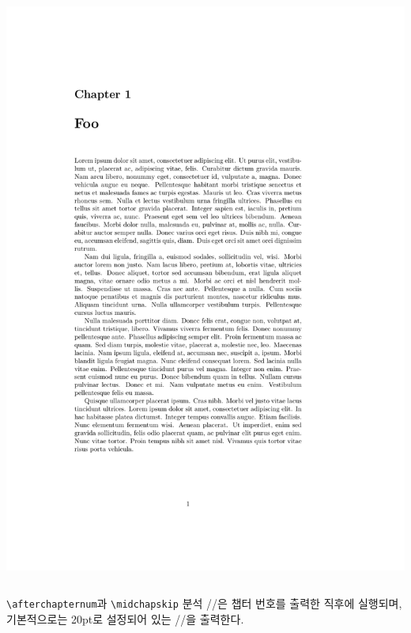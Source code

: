 \documentclass{beamer}
\def\tbs{\textbackslash}
\begin{document}
\begin{frame}[fragile]
\begin{overprint}
\begin{columns}
      \begin{column}{0.5\textwidth}
        \begin{latexcode}
          \renewcommand*{\chapterheadstart}{}
        \end{latexcode}
        \begin{center}
          \includegraphics[frame,page=1,width=0.8\linewidth]{examples/chapterheadstart-3}
        \end{center}
      \end{column}
    \end{columns}
  \end{overprint}
\end{frame}

\begin{frame}[fragile]
  {\texttt{\tbs afterchapternum}과 \texttt{\tbs midchapskip} 분석}
  \ltxverb/\afterchapternum/은 챕터 번호를 출력한 직후에 실행되며, 기본적으로는
  20pt로 설정되어 있는 \ltxverb/\midchapskip/을 출력한다.
\end{frame}
\end{document}
